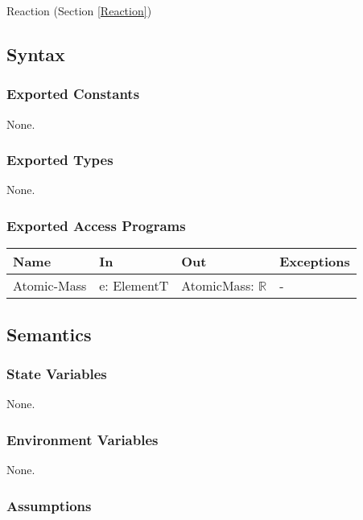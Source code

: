 \documentclass[12pt, titlepage]{article}
\begin{document}
Reaction (Section \ref{Reaction})

\subsection{Syntax}

\subsubsection{Exported Constants}

None.

\subsubsection{Exported Types}

None.


\subsubsection{Exported Access Programs}

\begin{center}
\begin{tabular}{p{2cm} p{4cm} p{4cm} p{2cm}}
\hline
\textbf{Name} & \textbf{In} & \textbf{Out} & \textbf{Exceptions} \\
\hline
{Atomic-Mass} & e: ElementT & AtomicMass: $\mathbb{R}$ & - \\
\hline
\end{tabular}
\end{center}

\subsection{Semantics}

\subsubsection{State Variables}

None.

\subsubsection{Environment Variables}

None.

\subsubsection{Assumptions}
\end{document}
